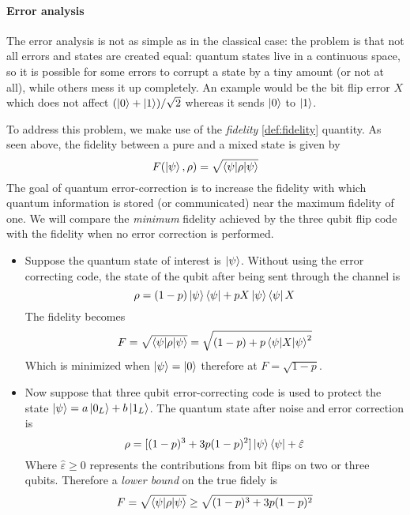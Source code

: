 \documentclass[11pt,a4paper]{article}
\theoremstyle{definition}
\theoremstyle{plain}
\theoremstyle{remark}
\begin{document}
\paragraph{Error analysis}

The error analysis is not as simple as in the classical case: the problem is that not all errors and states are created equal: 
quantum states live in a continuous space, so it is possible for some errors to corrupt a state by a tiny amount (or not at all), while others mess it up completely.
An example would be the bit flip error $X$ which does not affect $(\ket{0} + \ket{1}) / \sqrt{2}$ whereas it sends $\ket{0}$ to $\ket{1}$. 

To address this problem, we make use of the \emph{fidelity} \ref{def:fidelity} quantity. As seen above, the fidelity between a pure and a mixed state is given by 
$$ F(\ket{\psi}, \rho) = \sqrt{\braket{\psi | \rho | \psi}}$$
The goal of quantum error-correction is to increase the fidelity with which quantum information is stored (or communicated) near the maximum fidelity of one. 
We will compare the \emph{minimum} fidelity achieved by the three qubit flip code with the fidelity when no error correction is performed. 
\begin{itemize}
\item Suppose the quantum state of interest is $\ket{\psi}$. Without using the error correcting code, the state of the qubit after being sent through the channel is
$$ \rho = (1-p) \ket{\psi} \bra{\psi} + p X \ket{\psi} \bra{\psi} X$$ 
The fidelity becomes 
$$F = \sqrt{\braket{\psi | \rho | \psi}} = \sqrt{(1-p) + p \braket{\psi | X | \psi}^2}$$
Which is minimized when $\ket{\psi} = \ket{0}$ therefore at $F = \sqrt{1 - p}$. 

\item Now suppose that three qubit error-correcting code is used to protect the state $\ket{\psi} = a \ket{0_L} + b \ket{1_L}$. The quantum state after noise and error correction is 
$$\rho = [(1-p)^3 + 3p(1-p)^2] \ket{\psi} \bra{\psi} + \hat{\varepsilon}$$
Where $\hat{\varepsilon} \geq 0$ represents the contributions from bit flips on two or three qubits. Therefore a \emph{lower bound} on the true fidely is 
$$F = \sqrt{\braket{\psi | \rho | \psi}} \geq \sqrt{(1-p)^3 + 3p(1-p)^2}$$
\end{itemize}
\end{document}
